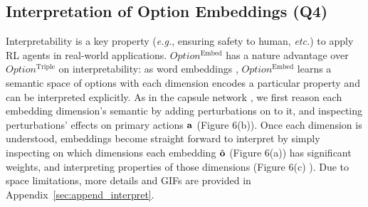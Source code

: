 \documentclass{article}
\newcommand{\linkblue}[1]{\textcolor[HTML]{2E649E}{#1}}
\begin{document}
\subsection{Interpretation of Option Embeddings (Q4)}
\label{sec:interpret}
\vspace{-1mm}Interpretability is a key property (\textit{e.g.}, ensuring safety to
human, \textit{etc.}) to apply RL agents in
real-world applications. $Option^{\textrm{Embed}}$ has a nature advantage
over $Option^{\textrm{Triple}}$ on interpretability: as word embeddings
\cite{vaswani2017attention}, $Option^{\textrm{Embed}}$ learns a semantic
space of options with each dimension encodes a particular
property and can be interpreted explicitly. As in the capsule
network \cite{sabour2017dynamic}, we first reason each embedding
dimension's semantic by adding perturbations on to it, and
inspecting perturbations' effects on primary actions ${\mathbf{a}}$
(Figure \linkblue{6(b)}). Once each dimension is
understood, embeddings become straight forward to interpret by
simply inspecting on which dimensions each embedding $\hat{{\mathbf{o}}}$
(Figure \linkblue{6(a)}) has significant weights, and
interpreting properties of those dimensions
(Figure \linkblue{6(c)} ). Due to space limitations,
more details and GIFs are provided in
Appendix~\ref{sec:append_interpret}.
\vspace{-5mm}\begin{center}
\end{center}
\end{document}
